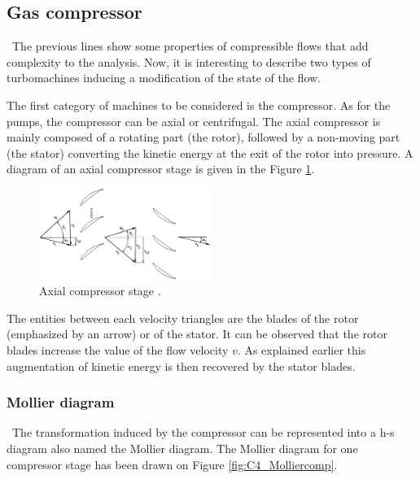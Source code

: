 \subsection{Gas compressor}
\quad\ The previous lines show some properties of compressible flows that add complexity to the analysis. Now, it is interesting to describe two types of turbomachines inducing a modification of the state of the flow.

The first category of machines to be considered is the compressor. As for the pumps, the compressor can be axial or centrifugal.  The axial compressor is mainly composed of a rotating part (the rotor), followed by a non-moving part (the stator) converting the kinetic energy at the exit of the rotor into pressure. A diagram of an axial compressor stage is given in the Figure \ref{fig:C4_compstage}.

\begin{figure}[h]
    \centering
    \includegraphics[width=0.5\textwidth]{Comp_stage.png}
    \caption{Axial compressor stage \cite{Hillewaert2019}.}
    \label{fig:C4_compstage}
\end{figure}

The entities between each velocity triangles are the blades of the rotor (emphasized by an arrow) or of the stator. It can be observed that the rotor blades increase the value of the flow velocity \(v\). As explained earlier this augmentation of kinetic energy is then recovered by the stator blades.

\subsubsection{Mollier diagram}
\quad\ The transformation induced by the compressor can be represented into a h-s diagram also named the Mollier diagram. The Mollier diagram for one compressor stage has been drawn on Figure \ref{fig:C4_Molliercomp}.

